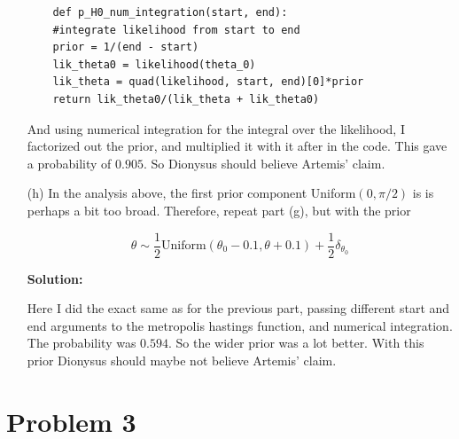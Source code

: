 \documentclass{article}
\begin{document}
\begin{enumerate}
\begin{verbatim}
    def p_H0_num_integration(start, end):
    #integrate likelihood from start to end
    prior = 1/(end - start)
    lik_theta0 = likelihood(theta_0)
    lik_theta = quad(likelihood, start, end)[0]*prior
    return lik_theta0/(lik_theta + lik_theta0)
\end{verbatim}

And using numerical integration for the integral over the likelihood, I factorized out the prior, and multiplied it with it after in the code.
This gave a probability of $0.905$. So Dionysus should believe Artemis' claim.


\item[(h)] In the analysis above, the first prior component Uniform$(0, \pi/2)$ is is perhaps
a bit too broad. Therefore, repeat part (g), but with the prior

\[
\theta \sim \frac{1}{2} \text{Uniform} (\theta_0 - 0.1, \theta + 0.1) + \frac{1}{2} \delta_{\theta_0}
\]

\textbf{Solution:}
\par
Here I did the exact same as for the previous part, passing different start and end arguments
to the metropolis hastings function, and numerical integration. The probability was $0.594$. So the wider prior
was a lot better. With this prior Dionysus should maybe not believe Artemis' claim.
\end{enumerate}
    

\section{Problem 3}
\end{document}
